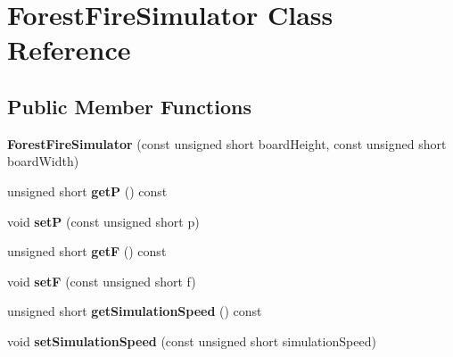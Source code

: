 \hypertarget{class_forest_fire_simulator}{}\section{Forest\+Fire\+Simulator Class Reference}
\label{class_forest_fire_simulator}
\subsection*{Public Member Functions}
\begin{DoxyCompactItemize}
\item 
{\bfseries Forest\+Fire\+Simulator} (const unsigned short board\+Height, const unsigned short board\+Width)\hypertarget{class_forest_fire_simulator_acc1e5b4eb1e9992595fa792f33d64528}{}\label{class_forest_fire_simulator_acc1e5b4eb1e9992595fa792f33d64528}

\item 
unsigned short {\bfseries getP} () const \hypertarget{class_forest_fire_simulator_aca8b6dcbc0ee2b4925b31774b1bd418b}{}\label{class_forest_fire_simulator_aca8b6dcbc0ee2b4925b31774b1bd418b}

\item 
void {\bfseries setP} (const unsigned short p)\hypertarget{class_forest_fire_simulator_af33484c4143441d5d06ef4f66f88a0d4}{}\label{class_forest_fire_simulator_af33484c4143441d5d06ef4f66f88a0d4}

\item 
unsigned short {\bfseries getF} () const \hypertarget{class_forest_fire_simulator_a10f512f389ccd1f72e7f467845c32ac4}{}\label{class_forest_fire_simulator_a10f512f389ccd1f72e7f467845c32ac4}

\item 
void {\bfseries setF} (const unsigned short f)\hypertarget{class_forest_fire_simulator_a08b490ca8cda7cf39096a42a33ad1ecc}{}\label{class_forest_fire_simulator_a08b490ca8cda7cf39096a42a33ad1ecc}

\item 
unsigned short {\bfseries get\+Simulation\+Speed} () const \hypertarget{class_forest_fire_simulator_aa986ac7fe4a5532f98ece282439f8694}{}\label{class_forest_fire_simulator_aa986ac7fe4a5532f98ece282439f8694}

\item 
void {\bfseries set\+Simulation\+Speed} (const unsigned short simulation\+Speed)\hypertarget{class_forest_fire_simulator_ad0c49dbc1347b53c6977408ab6a3d76d}{}\label{class_forest_fire_simulator_ad0c49dbc1347b53c6977408ab6a3d76d}


\end{DoxyCompactItemize}
